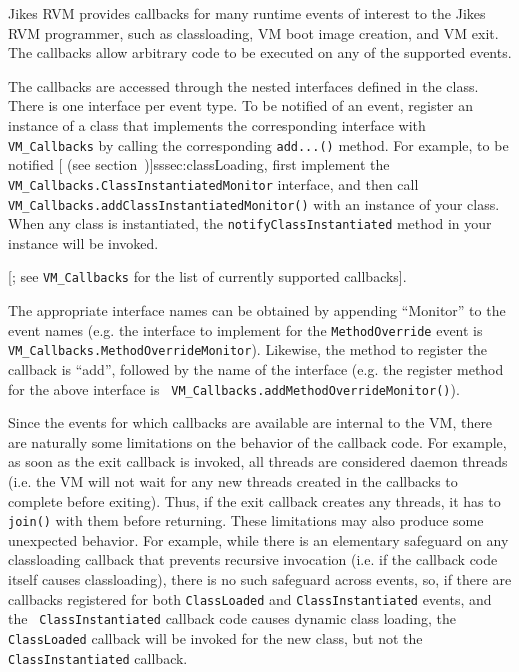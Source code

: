 

Jikes\TM{} RVM provides callbacks for many runtime events of
interest to the Jikes RVM 
programmer, such as classloading, VM boot image creation, and VM exit.  The
callbacks allow arbitrary code to be executed on any of the supported events.

The callbacks are accessed through the nested interfaces defined in the 
class.  There is one interface per event type.  To be notified
of an event, register an instance of a class that implements the corresponding
interface with {\tt VM\_Callbacks} by calling the corresponding {\tt add...()}
method.  For example, to be notified [ (see section~\Ref)]{sssec:classLoading}, first implement the {\tt
VM\_Callbacks.ClassInstantiatedMonitor} interface, and then call {\tt
VM\_Callbacks.addClassInstantiatedMonitor()} with an instance of your class.
When any class is instantiated, the {\tt notifyClassInstantiated} method in
your instance will be invoked.

[; see 
{\tt VM\_Callbacks} for the list of currently
supported callbacks]{\VMCallbacksURL}.

The appropriate interface names can be obtained by appending ``Monitor'' to the
event names (e.g. the interface to implement for the {\tt MethodOverride} event
is {\tt VM\_Callbacks.MethodOverrideMonitor}).  Likewise, the method to
register the callback is ``add'', followed by the name of the interface (e.g.
the register method for the above interface is {\tt
VM\_Callbacks.addMethodOverrideMonitor()}).

Since the events for which callbacks are available are internal to the VM,
there are naturally some limitations on the behavior of the callback code.  For
example, as soon as the exit callback is invoked, all threads are considered
daemon threads (i.e. the VM will not wait for any new threads created in the
callbacks to complete before exiting).  Thus, if the exit callback creates any
threads, it has to {\tt join()} with them before returning.  These limitations
may also produce some unexpected behavior.  For example, while there is an
elementary safeguard on any classloading callback that prevents recursive
invocation (i.e. if the callback code itself causes classloading), there is no
such safeguard across events, so, if there are callbacks registered for both
{\tt ClassLoaded} and {\tt ClassInstantiated} events, and the {\tt
ClassInstantiated} callback code causes dynamic class loading, the {\tt
ClassLoaded} callback will be invoked for the new class, but not the {\tt
ClassInstantiated} callback.

